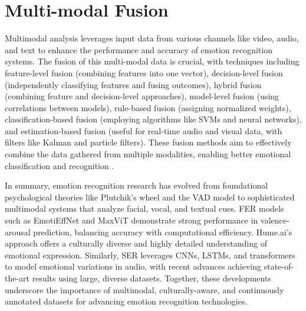 \section{Multi-modal Fusion}
\par Multimodal analysis leverages input data from various channels like video, audio, and text to enhance the performance and accuracy of emotion recognition systems. The fusion of this multi-modal data is crucial, with techniques including feature-level fusion (combining features into one vector), decision-level fusion (independently classifying features and fusing outcomes), hybrid fusion (combining feature and decision-level approaches), model-level fusion (using correlations between models), rule-based fusion (assigning normalized weights), classification-based fusion (employing algorithms like SVMs and neural networks), and estimation-based fusion (useful for real-time audio and visual data, with filters like Kalman and particle filters). These fusion methods aim to effectively combine the data gathered from multiple modalities, enabling better emotional classification and recognition \citep{poria2017review}.


In summary, emotion recognition research has evolved from foundational psychological theories like Plutchik’s wheel and the VAD model to sophisticated multimodal systems that analyze facial, vocal, and textual cues. FER models such as EmotiEffNet and MaxViT demonstrate strong performance in valence-arousal prediction, balancing accuracy with computational efficiency. Hume.ai’s approach offers a culturally diverse and highly detailed understanding of emotional expression. Similarly, SER leverages CNNs, LSTMs, and transformers to model emotional variations in audio, with recent advances achieving state-of-the-art results using large, diverse datasets. Together, these developments underscore the importance of multimodal, culturally-aware, and continuously annotated datasets for advancing emotion recognition technologies.